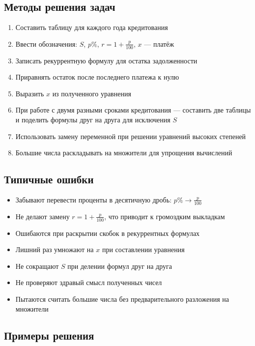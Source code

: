 \documentclass[a4paper,12pt]{article}
\begin{document}
\subsection*{Методы решения задач}
\begin{enumerate}[label=\arabic*., leftmargin=*]
    \item Составить таблицу для каждого года кредитования
    \item Ввести обозначения: $S$, $p\%$, $r = 1 + \frac{p}{100}$, $x$ — платёж
    \item Записать рекуррентную формулу для остатка задолженности
    \item Приравнять остаток после последнего платежа к нулю
    \item Выразить $x$ из полученного уравнения
    \item При работе с двумя разными сроками кредитования — составить две таблицы и поделить формулы друг на друга для исключения $S$
    \item Использовать замену переменной при решении уравнений высоких степеней
    \item Большие числа раскладывать на множители для упрощения вычислений
\end{enumerate}

\subsection*{Типичные ошибки}
\begin{itemize}[label=\textcolor{accent}{\textbullet}, leftmargin=*]
    \item Забывают перевести проценты в десятичную дробь: $p\% \to \frac{p}{100}$
    \item Не делают замену $r = 1 + \frac{p}{100}$, что приводит к громоздким выкладкам
    \item Ошибаются при раскрытии скобок в рекуррентных формулах
    \item Лишний раз умножают на $x$ при составлении уравнения
    \item Не сокращают $S$ при делении формул друг на друга
    \item Не проверяют здравый смысл полученных чисел
    \item Пытаются считать большие числа без предварительного разложения на множители
\end{itemize}

\subsection*{Примеры решения}
\end{document}
